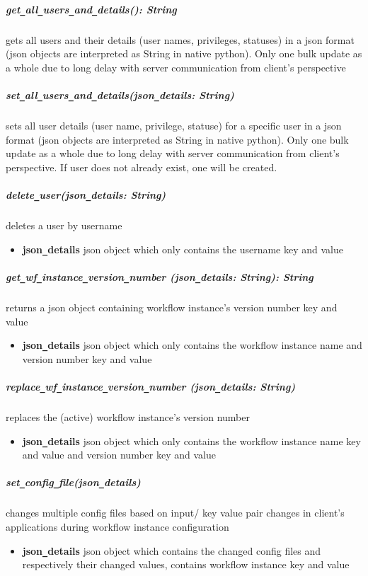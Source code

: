 \subparagraph{get\texttt{\_}all\texttt{\_}users\texttt{\_}and\texttt{\_}details(): String}
gets all users and their details (user names, privileges, statuses) in a json format
(json objects are interpreted as String in native python). Only one bulk update as a whole
due to long delay with server communication from client's perspective


\subparagraph{set\texttt{\_}all\texttt{\_}users\texttt{\_}and\texttt{\_}details(json\texttt{\_}details: String)}
sets all user details (user name, privilege, statuse) for a specific user in a json format
(json objects are interpreted as String in native python). Only one bulk update as a whole
due to long delay with server communication from client's perspective. If user does not already exist, one will be created.

\subparagraph{delete\texttt{\_}user(json\texttt{\_}details: String)}
deletes a user by username
\begin{itemize}
        \item \textbf{json\texttt{\_}details}
        json object which only contains the username key and value
\end{itemize}


\subparagraph{get\texttt{\_}wf\texttt{\_}instance\texttt{\_}version\texttt{\_}number
(json\texttt{\_}details: String): String}
returns a json object containing workflow instance's version number key and value
\begin{itemize}
        \item \textbf{json\texttt{\_}details}
        json object which only contains the workflow instance name and version number key and value
\end{itemize}

\subparagraph{replace\texttt{\_}wf\texttt{\_}instance\texttt{\_}version\texttt{\_}number
(json\texttt{\_}details: String)}
replaces the (active) workflow instance's version number 
\begin{itemize}
        \item \textbf{json\texttt{\_}details}
        json object which only contains the workflow instance name key and value and version number key and value
\end{itemize}


\subparagraph{set\texttt{\_}config\texttt{\_}file(json\texttt{\_}details)}
changes multiple config files based on input/ key value pair changes in client's applications during workflow instance 
configuration
\begin{itemize}
        \item \textbf{json\texttt{\_}details}
        json object which contains the changed config files and respectively their changed values, contains workflow
        instance key and value
\end{itemize}

